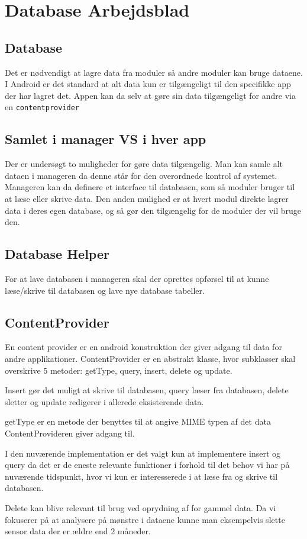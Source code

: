 \chapter{Database Arbejdsblad}
\section{Database}
Det er nødvendigt at lagre data fra moduler så andre moduler kan bruge dataene.
I Android er det standard at alt data kun er tilgængeligt til den specifikke app der har lagret det.
Appen kan da selv at gøre sin data tilgængeligt for andre via en \texttt{contentprovider}

\section{Samlet i manager VS i hver app}
Der er undersøgt to muligheder for gøre data tilgængelig.
Man kan samle alt dataen i manageren da denne står for den overordnede kontrol af systemet. 
Manageren kan da definere et interface til databasen, som så moduler bruger til at læse eller skrive data. 
Den anden mulighed er at hvert modul direkte lagrer data i deres egen database, og så gør den tilgængelig for de moduler der vil bruge den.


\section{Database Helper}
For at lave databasen i manageren skal der oprettes opførsel til at kunne læse/skrive til databasen og lave nye database tabeller.

\section{ContentProvider}
En content provider er en android konstruktion der giver adgang til data for andre applikationer.
ContentProvider er en abstrakt klasse, hvor subklasser skal overskrive 5 metoder:  getType, query, insert, delete og update. \cite{contentprovider}

Insert gør det muligt at skrive til databasen, query læser fra databasen, delete sletter og update redigerer i allerede eksisterende data.

getType er en metode der benyttes til at angive MIME typen af det data ContentProvideren giver adgang til.

I den nuværende implementation er det valgt kun at implementere insert og query da det er de eneste relevante funktioner i forhold til det behov vi har på nuværende tidspunkt, hvor vi kun er interesserede i at læse fra og skrive til databasen.

Delete kan blive relevant til brug ved oprydning af for gammel data. Da vi fokuserer på at analysere på mønstre i dataene kunne man eksempelvis slette sensor data der er ældre end 2 måneder.
